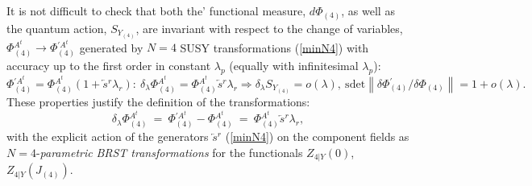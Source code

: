 \documentclass[10pt]{article}
\begin{document}
 It is not difficult to check that both the' functional measure, $d \Phi_{(4)} $, as well as the quantum action,
 $S_{Y_{(4)}}$, are invariant with respect to the change of variables, ${\Phi}{}^{A^t}_{(4)}\to  {\Phi}{}^{\prime  A^t}_{(4)}$ generated by  $N=4$ SUSY transformations (\ref{minN4}) with accuracy   up to the first order in constant $\lambda_p$  (equally with infinitesimal  $\lambda_p$):
\begin{equation}\label{N4inv}
{\Phi}{}^{\prime  A^t}_{(4)}={\Phi}{}^{A^t}_{(4)}(1+\overleftarrow{s}{}^r\lambda_r): \ \delta_{\lambda}{\Phi}{}^{  A^t}_{(4)}={\Phi}{}^{  A^t}_{(4)}\overleftarrow{s}{}^r\lambda_r \Longrightarrow    \delta_{\lambda}S_{Y_{(4)}} =o(\lambda), \ \mathrm{sdet}\left\| \delta{\Phi}{}^{\prime}_{(4)}/  \delta{\Phi}_{(4)}  \right\| =1+o(\lambda).
\end{equation}
 These properties justify the definition of  the transformations:
 \begin{equation}\label{n4brst}
   \delta_{\lambda}{\Phi}{}^{  A^t}_{(4)}\ = \ {\Phi}{}^{\prime  A^t}_{(4)}-{\Phi}{}^{  A^t}_{(4)}\ = \ {\Phi}{}^{  A^t}_{(4)}\overleftarrow{s}{}^r\lambda_r,\
 \end{equation}
 with the explicit action of the generators $\overleftarrow{s}{}^r$ (\ref{minN4})  on  the component fields as $N=4$-\emph{parametric}  \emph{BRST transformations} for the functionals ${Z}_{4|Y}(0)$, ${Z}_{4|Y}({J}_{(4)})$.
\end{document}
